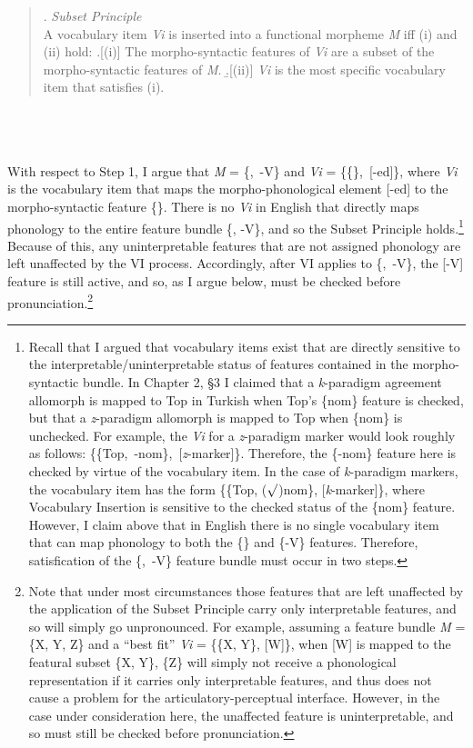 \singlespacing
\begin{minipage}{5.5in}
\begin{quote}
\ex. {\it Subset Principle}\\
A vocabulary item {\it Vi} is inserted into a functional morpheme {\it M} iff (i) and (ii) hold:
\a.[(i)] The morpho-syntactic features of {\it Vi} are a subset of the morpho-syntactic features of {\it M}.
\b.[(ii)] {\it Vi} is the most specific vocabulary item that satisfies (i).

\end{quote}
\end{minipage}\\\\\\
\onehalfspacing
With respect to Step 1, I argue that {\it M} = \{\mbox{},~-V\} and {\it Vi} = \{\{\mbox{}\},~[-ed]\}, where {\it Vi} is the vocabulary item that maps the morpho-phonological element [-ed] to the morpho-syntactic feature \{\mbox{}\}. There is no {\it Vi} in English that directly maps phonology to the entire feature bundle \{\mbox{}, -V\}, and so the Subset Principle holds.\footnote{Recall that I argued that vocabulary items exist that are directly sensitive to the interpretable/uninterpretable status of features contained in the morpho-syntactic bundle. In Chapter 2, \S3 I claimed that a {\it k}-paradigm agreement allomorph is mapped to Top in Turkish when Top's \{nom\} feature is checked, but that a {\it z}-paradigm allomorph is mapped to Top when \{nom\} is unchecked. For example, the {\it Vi} for a {\it z}-paradigm marker would look roughly as follows: \{\{Top,~-nom\},~[{\it z}-marker]\}. Therefore, the \{-nom\} feature here is checked by virtue of the vocabulary item. In the case of {\it k}-paradigm markers, the vocabulary item has the form \{\{Top, ($\surd$)nom\}, [{\it k}-marker]\}, where Vocabulary Insertion is sensitive to the checked status of the \{nom\} feature. However, I claim above that in English there is no single vocabulary item that can map phonology to both the \{\mbox{}\} and \{-V\} features. Therefore, satisfication of the \{\mbox{},~-V\} feature bundle must occur in two steps.} Because of this, any uninterpretable features that are not assigned phonology are left unaffected by the VI process. Accordingly, after VI applies to \{\mbox{},~-V\}, the [-V] feature is still active, and so, as I argue below, must be checked before pronunciation.\footnote{Note that under most circumstances those features that are left unaffected by the application of the Subset Principle carry only interpretable features, and so will simply go unpronounced. For example, assuming a feature bundle {\it M} = \{X, Y, Z\} and a ``best fit'' {\it Vi} = \{\{X, Y\}, [W]\}, when [W] is mapped to the featural subset \{X, Y\}, \{Z\} will simply not receive a phonological representation if it carries only interpretable features, and thus does not cause a problem for the articulatory-perceptual interface. However, in the case under consideration here, the unaffected feature is uninterpretable, and so must still be checked before pronunciation.}

